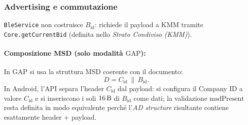 \documentclass[a4paper,11pt,table,dvipsnames]{article}
\begin{document}
\subsubsection{Advertising e commutazione}
\texttt{BleService} non costruisce \(B_{\text{id}}\): richiede il payload a KMM tramite \texttt{Core.getCurrentBid} (definita nello \emph{Strato Condiviso (KMM)}).

\paragraph{Composizione MSD (solo modalità \(\text{GAP}\)):}
In \(\text{GAP}\) si usa la struttura MSD coerente con il documento:
\[
    D = C_{\text{id}} \ \| \ B_{\text{id}}.
\]
In Android, l’API separa l’header \(C_{\text{id}}\) dal payload: si configura il Company ID a valore \(C_{\text{id}}\) e si inseriscono i soli \(\SI{16}{\byte}\) di \(B_{\text{id}}\) come dati; la validazione \(\text{msdPresent}\) resta definita in modo equivalente perché l’\emph{AD structure} risultante contiene esattamente header + payload.
\end{document}
